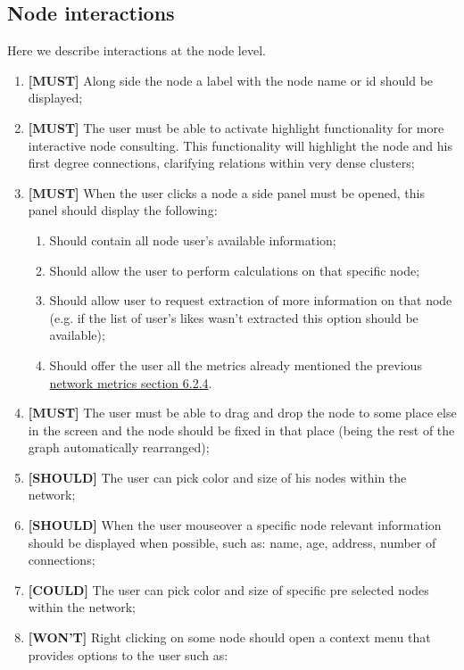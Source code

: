 \subsection{Node interactions}

Here we describe interactions at the node level.

\begin{enumerate}
    \item \textbf{[MUST]} Along side the node a label with the node name or id should be displayed;
    \item \textbf{[MUST]} The user must be able to activate highlight functionality for more interactive node consulting. This functionality will highlight the node and his first degree connections, clarifying relations within very dense clusters; %
    \item \textbf{[MUST]} When the user clicks a node a side panel must be opened, this panel should display the following:
    \begin{enumerate}
        \item Should contain all node user's available information;
        \item Should allow the user to perform calculations on that specific node;
        \item Should allow user to request extraction of more information on that node (e.g. if the list of user's likes wasn't extracted this option should be available);
        \item Should offer the user all the metrics already mentioned the previous \hyperref[subsec:networkmetrics]{network metrics section 6.2.4}.
    \end{enumerate}
    \item \textbf{[MUST]} The user must be able to drag and drop the node to some place else in the screen and the node should be fixed in that place (being the rest of the graph automatically rearranged); %
    \item \textbf{[SHOULD]} The user can pick color and size of his nodes within the network;
    \item \textbf{[SHOULD]} When the user mouseover a specific node relevant information should be displayed when possible, such as: name, age, address, number of connections;
    \item \textbf{[COULD]} The user can pick color and size of specific pre selected nodes within the network;
    \item \textbf{[WON'T]} Right clicking on some node should open a context menu that provides options to the user such as:

\end{enumerate}
